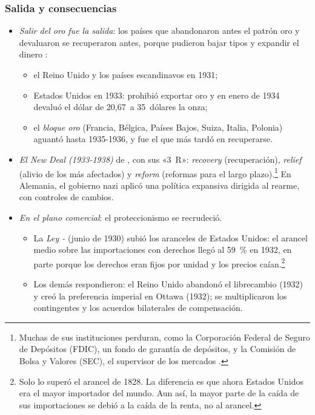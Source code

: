 \documentclass[11pt]{article}
\begin{document}
\subsubsection{Salida y consecuencias}

\begin{itemize}
\item \emph{Salir del oro fue la salida}: los países que abandonaron antes el patrón oro y devaluaron se recuperaron antes, porque pudieron bajar tipos y expandir el dinero \nocite{EichengreenSachs1985,Bernanke1995Macroeconomics}:
  \begin{itemize}
  \item el Reino Unido y los países escandinavos en 1931;
  \item Estados Unidos en 1933:  prohibió exportar oro y en enero de 1934 devaluó el dólar de 20,67~a 35~dólares la onza;
  \item el \emph{bloque oro} (Francia, Bélgica, Países Bajos, Suiza, Italia, Polonia) aguantó hasta 1935-1936, y fue el que más tardó en recuperarse.
  \end{itemize}
\item \emph{El \emph{New Deal} (1933-1938)} de , con sus «3~R»: \emph{recovery} (recuperación), \emph{relief} (alivio de los más afectados) y \emph{reform} (reformas para el largo plazo).\footnote{Muchas de sus instituciones perduran, como la Corporación Federal de Seguro de Depósitos (FDIC), un fondo de garantía de depósitos, y la Comisión de Bolsa y Valores (SEC), el supervisor de los mercados .} En Alemania, el gobierno nazi aplicó una política expansiva dirigida al rearme, con controles de cambios.
\item \emph{En el plano comercial}: el proteccionismo se recrudeció.
  \begin{itemize}
  \item La \emph{Ley -} (junio de 1930) subió los aranceles de Estados Unidos: el arancel medio sobre las importaciones con derechos llegó al 59~\% en 1932, en parte porque los derechos eran fijos por unidad y los precios caían\nocite{Irwin2011Peddling}.\footnote{Solo lo superó el arancel de 1828. La diferencia es que ahora Estados Unidos era el mayor importador del mundo. Aun así, la mayor parte de la caída de sus importaciones se debió a la caída de la renta, no al arancel\nocite{Irwin2011Peddling}.}
  \item Los demás respondieron: el Reino Unido abandonó el librecambio (1932) y creó la preferencia imperial en Ottawa (1932); se multiplicaron los contingentes y los acuerdos bilaterales de compensación.

\end{itemize}
\end{itemize}
\end{document}
